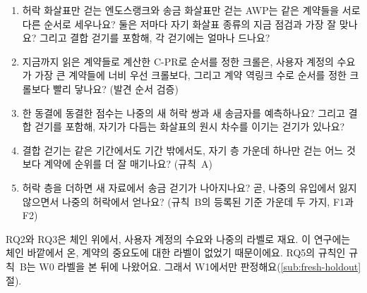 \begin{enumerate}
\item[RQ1.] 허락 화살표만 걷는 엔도스랭크와 송금 화살표만 걷는 AWP는 같은 계약들을 서로 다른 순서로 세우나요? 둘은 저마다 자기 화살표 종류의 지금 점검과 가장 잘 맞나요? 그리고 결합 걷기를 포함해, 각 걷기에는 얼마나 드나요?
\item[RQ2.] 지금까지 읽은 계약들로 계산한 \mbox{C-PR}로 순서를 정한 크롤은, 사용자 계정의 수요가 가장 큰 계약들에 너비 우선 크롤보다, 그리고 계약 역링크 수로 순서를 정한 크롤보다 빨리 닿나요? (발견 순서 검증)
\item[RQ3.] 한 동결에 동결한 점수는 나중의 새 허락 쌍과 새 송금자를 예측하나요? 그리고 결합 걷기를 포함해, 자기가 다듬는 화살표의 원시 차수를 이기는 걷기가 있나요?
\item[RQ4.] 결합 걷기는 같은 기간에서도 기간 밖에서도, 자기 층 가운데 하나만 걷는 어느 것보다 계약에 순위를 더 잘 매기나요? (규칙~A)
\item[RQ5.] 허락 층을 더하면 새 자료에서 송금 걷기가 나아지나요? 곧, 나중의 유입에서 잃지 않으면서 나중의 허락에서 얻나요? (규칙~B의 등록된 기준 가운데 두 가지, F1과 F2)
\end{enumerate}

RQ2와 RQ3은 체인 위에서, 사용자 계정의 수요와 나중의 라벨로 재요. 이 연구에는 체인 바깥에서 온, 계약의 중요도에 대한 라벨이 없었기 때문이에요. RQ5의 규칙인 규칙~B는 W0 라벨을 본 뒤에 나왔어요. 그래서 W1에서만 판정해요(\ref{sub:fresh-holdout}절).


